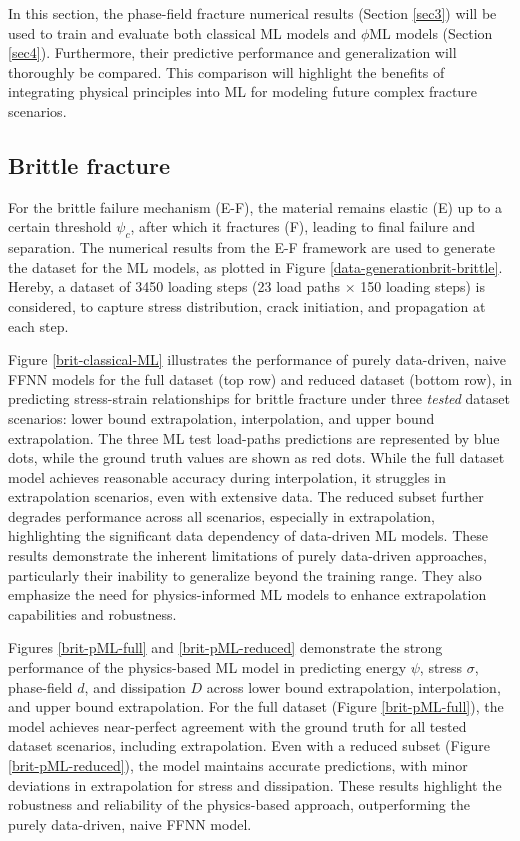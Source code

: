 \documentclass[final,3p,times]{elsarticle}
\begin{document}
In this section, the phase-field fracture numerical results (Section \ref{sec3}) will be used to train and evaluate both classical ML models and $\phi$ML models (Section \ref{sec4}). Furthermore, their predictive performance and generalization will thoroughly be compared. This comparison will highlight the benefits of integrating physical principles into ML for modeling future complex fracture scenarios.






\subsection{Brittle fracture}




For the brittle failure mechanism (E-F), the material remains elastic (E) up to a certain threshold $\psi_c$, after which it fractures (F), leading to final failure and separation. The numerical results from the E-F framework are used to generate the dataset for the ML models, as plotted in Figure \ref{data-generationbrit-brittle}. Hereby, a dataset of 3450 loading steps (23 load paths $\times$ 150 loading steps) is considered, to capture stress distribution, crack initiation, and propagation at each step.

Figure \ref{brit-classical-ML} illustrates the performance of purely data-driven, naive FFNN models for the full dataset (top row) and reduced dataset (bottom row), in predicting stress-strain relationships for brittle fracture under three {\it tested} dataset scenarios: lower bound extrapolation, interpolation, and upper bound extrapolation. The three ML test load-paths predictions are represented by blue dots, while the ground truth values are shown as red dots. While the full dataset model achieves reasonable accuracy during interpolation, it struggles in extrapolation scenarios, even with extensive data. The reduced subset further degrades performance across all scenarios, especially in extrapolation, highlighting the significant data dependency of data-driven ML models. These results demonstrate the inherent limitations of purely data-driven approaches, particularly their inability to generalize beyond the training range. They also emphasize the need for physics-informed ML models to enhance extrapolation capabilities and robustness.

Figures \ref{brit-pML-full} and \ref{brit-pML-reduced} demonstrate the strong performance of the physics-based ML model in predicting energy $\psi$, stress $\sigma$, phase-field $d$, and dissipation $D$ across lower bound extrapolation, interpolation, and upper bound extrapolation. For the full dataset (Figure \ref{brit-pML-full}), the model achieves near-perfect agreement with the ground truth for all tested dataset scenarios, including extrapolation. Even with a reduced subset (Figure \ref{brit-pML-reduced}), the model maintains accurate predictions, with minor deviations in extrapolation for stress and dissipation. These results highlight the robustness and reliability of the physics-based approach, outperforming the purely data-driven, naive FFNN model.
\end{document}
